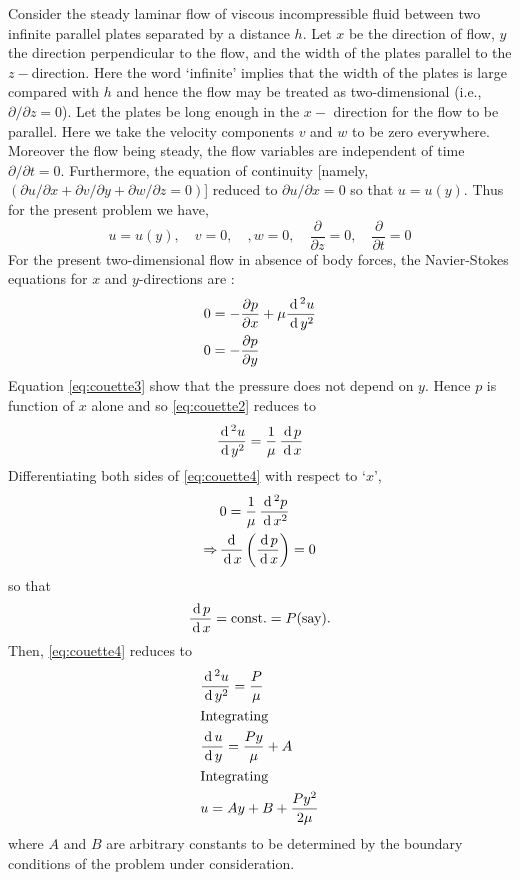 \documentclass[../main-sheet.tex]{subfiles}
\begin{document}
\begin{soln}
    Consider the steady laminar flow of viscous incompressible fluid between two infinite parallel plates separated by a distance \(h \). Let \(x \) be the direction of flow, \(y \) the direction perpendicular to the flow, and the width of the plates parallel to the \(z-\)direction. Here the word `infinite' implies that the width of the plates is large compared with \(h \) and hence the flow may be treated as two-dimensional (i.e., \(\partial/\partial z=0\)). Let the plates be long enough in the \(x-\) direction for the flow to be parallel. Here we take the velocity components \(v \) and \(w \) to be zero everywhere. Moreover the flow being steady, the flow variables are independent of time \(\partial/\partial t=0\). Furthermore, the equation of continuity [namely, \((\partial u/\partial x+\partial v/\partial y+\partial w/\partial z=0)\)] reduced to \(\partial u/\partial x=0\) so that \(u=u(y )\). Thus for the present problem we have,
    \begin{equation}
        u=u(y),\quad v=0,\quad, w=0,\quad \frac{\partial }{\partial z}=0,\quad \frac{\partial }{\partial t}=0 \label{eq:couette1}
    \end{equation}
    For the present two-dimensional flow in absence of body forces, the Navier-Stokes equations for \(x\) and \(y\)-directions are :
    \begin{align}
        0&=-\frac{\partial p }{\partial x }+\mu\frac{\,\mathrm{d}\,^2 u }{\,\mathrm{d}\, y^2}\label{eq:couette2}\\
        0&=-\frac{\partial p }{\partial y}\label{eq:couette3}
    \end{align}
Equation \eqref{eq:couette3} show that the pressure does not depend on \(y \). Hence \(p\) is function of \(x\) alone and so \eqref{eq:couette2} reduces to
\begin{equation}
    \frac{\,\mathrm{d}\,^2 u }{\,\mathrm{d}\, y^2}=\frac{1}{\mu}\,\frac{\,\mathrm{d}\, p }{\,\mathrm{d}\, x}\label{eq:couette4}
\end{equation}
Differentiating both sides of \eqref{eq:couette4} with respect to `\(x \)',
\begin{align*}
    &0=\frac{1}{\mu}\,\frac{\,\mathrm{d}\,^2 p }{\,\mathrm{d}\, x^2}\\
    \Rightarrow\,&\frac{\,\mathrm{d}\,}{\,\mathrm{d}\, x}\left(\frac{\,\mathrm{d}\, p }{\,\mathrm{d}\, x}\right)=0
\end{align*}
so that
\[\frac{\,\mathrm{d}\, p}{\,\mathrm{d}\, x} = \text{const.} = P \text{(say)}.\]
Then, \eqref{eq:couette4} reduces to
\begin{align}
    &\frac{\,\mathrm{d}\,^2 u }{\,\mathrm{d}\, y^2}=\frac{P }{\mu}\notag\\
    \intertext{Integrating}
    &\frac{\,\mathrm{d}\, u }{\,\mathrm{d}\, y}=\frac{P y}{\mu}+A\notag\\
    \intertext{Integrating}
    &u=Ay+B+\frac{P y^2}{2\mu}\label{eq:couette5}
\end{align}
where \(A\) and \(B\) are arbitrary constants to be determined by the boundary conditions of the problem under consideration.



\end{soln}
\end{document}
